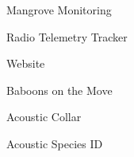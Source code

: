 \item Mangrove Monitoring
\item Radio Telemetry Tracker
\item Website
\item Baboons on the Move
\item Acoustic Collar
\item Acoustic Species ID
